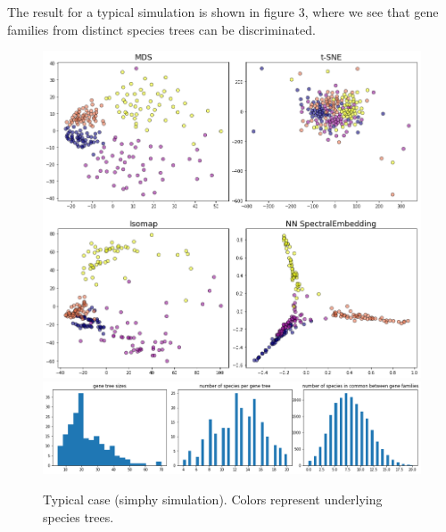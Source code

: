 The result for a typical simulation is shown in figure 3, where we see that gene families from distinct species trees
can be discriminated.


\begin{figure}[!htbp]
\begin{minipage}{7in}\centering
  \includegraphics[width = 6in]{figure003a.png}
  \includegraphics[width = 6in]{figure003b.png}
\end{minipage}
\caption{\label{figure003}
Typical case (simphy simulation). Colors represent underlying species trees.
}\end{figure}

